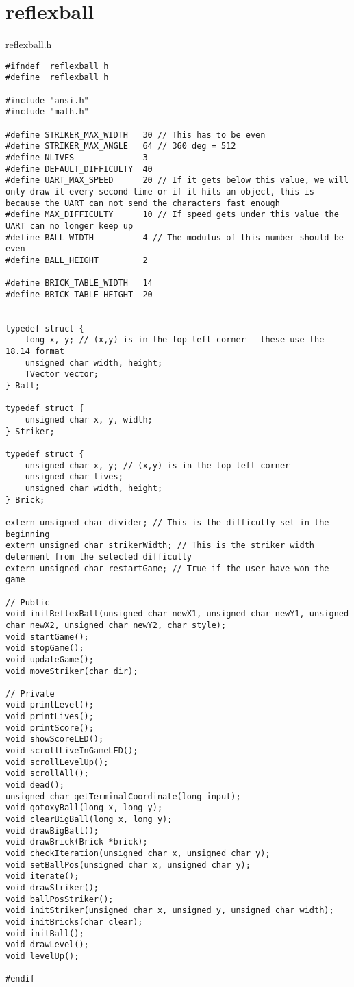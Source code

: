 \section{reflexball}
\label{reflexball}

\underline{reflexball.h}
\begin{lstlisting}
#ifndef _reflexball_h_
#define _reflexball_h_

#include "ansi.h"
#include "math.h"

#define STRIKER_MAX_WIDTH	30 // This has to be even
#define STRIKER_MAX_ANGLE	64 // 360 deg = 512
#define NLIVES				3
#define DEFAULT_DIFFICULTY	40
#define UART_MAX_SPEED		20 // If it gets below this value, we will only draw it every second time or if it hits an object, this is because the UART can not send the characters fast enough
#define MAX_DIFFICULTY		10 // If speed gets under this value the UART can no longer keep up
#define BALL_WIDTH			4 // The modulus of this number should be even
#define BALL_HEIGHT			2

#define BRICK_TABLE_WIDTH	14
#define BRICK_TABLE_HEIGHT	20


typedef struct {
	long x, y; // (x,y) is in the top left corner - these use the 18.14 format
	unsigned char width, height;
	TVector vector;
} Ball;

typedef struct {
	unsigned char x, y, width;
} Striker;

typedef struct {
	unsigned char x, y; // (x,y) is in the top left corner
	unsigned char lives;
	unsigned char width, height;
} Brick;

extern unsigned char divider; // This is the difficulty set in the beginning
extern unsigned char strikerWidth; // This is the striker width determent from the selected difficulty
extern unsigned char restartGame; // True if the user have won the game

// Public
void initReflexBall(unsigned char newX1, unsigned char newY1, unsigned char newX2, unsigned char newY2, char style);
void startGame();
void stopGame();
void updateGame();
void moveStriker(char dir);

// Private
void printLevel();
void printLives();
void printScore();
void showScoreLED();
void scrollLiveInGameLED();
void scrollLevelUp();
void scrollAll();
void dead();
unsigned char getTerminalCoordinate(long input);
void gotoxyBall(long x, long y);
void clearBigBall(long x, long y);
void drawBigBall();
void drawBrick(Brick *brick);
void checkIteration(unsigned char x, unsigned char y);
void setBallPos(unsigned char x, unsigned char y);
void iterate();
void drawStriker();
void ballPosStriker();
void initStriker(unsigned char x, unsigned y, unsigned char width);
void initBricks(char clear);
void initBall();
void drawLevel();
void levelUp();

#endif
\end{lstlisting}

